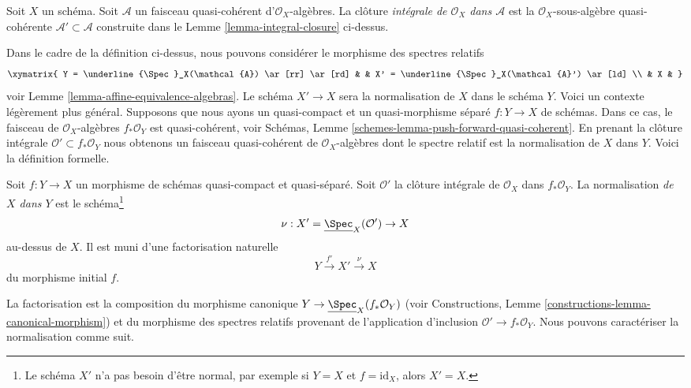 \begin{definition}
\label{definition-integral-closure}
Soit $X$ un schéma. Soit $\mathcal{A}$ un faisceau quasi-cohérent
d'$\mathcal{O}_X$-algèbres. La clôture {\it intégrale
de $\mathcal{O}_X$ dans $\mathcal{A}$} est la $\mathcal{O}_X$-sous-algèbre
quasi-cohérente $\mathcal{A}' \subset \mathcal{A}$ construite
dans le Lemme \ref{lemma-integral-closure} ci-dessus.
\end{definition}

\noindent
Dans le cadre de la définition ci-dessus, nous pouvons considérer le morphisme
des spectres relatifs
$$
\xymatrix{
Y = \underline{\Spec}_X(\mathcal{A}) \ar[rr] \ar[rd] & &
X' = \underline{\Spec}_X(\mathcal{A}') \ar[ld] \\
& X &
}
$$
voir Lemme \ref{lemma-affine-equivalence-algebras}. Le schéma $X' \to X$ sera
la normalisation de $X$ dans le schéma $Y$. Voici un
contexte légèrement plus général. Supposons que nous
ayons un quasi-compact et un quasi-morphisme séparé
$f : Y \to X$ de schémas. Dans ce
cas, le faisceau de $\mathcal{O}_X$-algèbres $f_*\mathcal{O}_Y$ est quasi-cohérent,
voir Schémas, Lemme \ref{schemes-lemma-push-forward-quasi-coherent}. En prenant la clôture
intégrale $\mathcal{O}' \subset f_*\mathcal{O}_Y$ nous obtenons un faisceau quasi-cohérent
de $\mathcal{O}_X$-algèbres dont le spectre relatif est
la normalisation de $X$ dans $Y$. Voici la définition
formelle.

\begin{definition}
\label{definition-normalization-X-in-Y}
Soit $f : Y \to X$ un morphisme de schémas quasi-compact et quasi-séparé. Soit $\mathcal{O}'$ la clôture
intégrale de $\mathcal{O}_X$ dans $f_*\mathcal{O}_Y$. La normalisation {\it
de $X$ dans $Y$} est le schéma\footnote{
Le schéma $X'$ n'a pas besoin d'être normal, par exemple si $Y = X$
et $f = \text{id}_X$, alors $X' = X$.}
$$
\nu : X' = \underline{\Spec}_X(\mathcal{O}') \to X
$$
au-dessus de $X$. Il est muni d'une factorisation naturelle
$$
Y \xrightarrow{f'} X' \xrightarrow{\nu} X
$$
du morphisme initial $f$.
\end{definition}

\noindent
La factorisation est la composition du morphisme
canonique $Y \to \underline{\Spec}_X(f_*\mathcal{O}_Y)$ (voir Constructions,
Lemme \ref{constructions-lemma-canonical-morphism})
et du morphisme des spectres
relatifs provenant de l'application d'inclusion $\mathcal{O}' \to f_*\mathcal{O}_Y$.
Nous pouvons caractériser la normalisation
comme suit.

